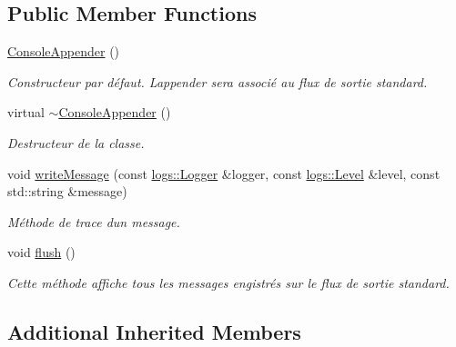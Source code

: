 \subsection*{Public Member Functions}
\begin{DoxyCompactItemize}
\item 
\mbox{\label{classlogs_1_1ConsoleAppender_a4c1c5c3fb8c290aa54fb48b65cf4151d}} 
\hyperlink{classlogs_1_1ConsoleAppender_a4c1c5c3fb8c290aa54fb48b65cf4151d}{Console\+Appender} ()
\begin{DoxyCompactList}\small\item\em Constructeur par défaut. L\textquotesingle{}appender sera associé au flux de sortie standard. \end{DoxyCompactList}\item 
\mbox{\label{classlogs_1_1ConsoleAppender_abf5d52e24c1afecdaacf3d4b45ee28ba}} 
virtual \hyperlink{classlogs_1_1ConsoleAppender_abf5d52e24c1afecdaacf3d4b45ee28ba}{$\sim$\+Console\+Appender} ()
\begin{DoxyCompactList}\small\item\em Destructeur de la classe. \end{DoxyCompactList}\item 
void \hyperlink{classlogs_1_1ConsoleAppender_a8bc998ae5666863d846b6909207b2fc7}{write\+Message} (const \hyperlink{classlogs_1_1Logger}{logs\+::\+Logger} \&logger, const \hyperlink{classlogs_1_1Level}{logs\+::\+Level} \&level, const std\+::string \&message)
\begin{DoxyCompactList}\small\item\em Méthode de trace d\textquotesingle{}un message. \end{DoxyCompactList}\item 
\mbox{\label{classlogs_1_1ConsoleAppender_afc3661954e4bdeee3f80da1984494a36}} 
void \hyperlink{classlogs_1_1ConsoleAppender_afc3661954e4bdeee3f80da1984494a36}{flush} ()
\begin{DoxyCompactList}\small\item\em Cette méthode affiche tous les messages engistrés sur le flux de sortie standard. \end{DoxyCompactList}\end{DoxyCompactItemize}
\subsection*{Additional Inherited Members}


